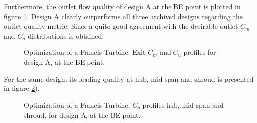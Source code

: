 Furthermore, the outlet flow quality of design A at the BE point is plotted in figure  \ref{Francis-A-OUT}. Design A clearly outperforms all three archived designs regarding the outlet quality metric. Since a quite good agreement  with the desirable outlet $C_m$ and $C_u$ distributions is obtained.

\begin{figure}[h!]
\begin{minipage}[b]{1\linewidth}
 \centering
\end{minipage}
\caption{Optimization of a Francis Turbine: Exit $C_m$ and $C_u$ profiles for design A, at the BE point.}
\label{Francis-A-OUT}
\end{figure}

For the same design, its loading quality at hub, mid-span and shroud is presented in figure \ref{Francis-A-LOAD}).

\begin{figure}[h!]
\begin{minipage}[b]{1\linewidth}
 \centering
\end{minipage}
\caption{Optimization of a Francis Turbine: $C_p$ profiles hub, mid-span and shroud, for design A, at the BE point.}
\label{Francis-A-LOAD}
\end{figure} 

